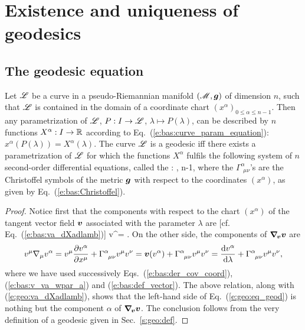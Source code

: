 
\section{Existence and uniqueness of geodesics}

\subsection{The geodesic equation}

\begin{greybox}
Let $\mathscr{L}$ be a curve in a pseudo-Riemannian
manifold $(\mathscr{M},\bm{g})$ of dimension $n$, such that
$\mathscr{L}$ is contained in the domain of a coordinate chart $(x^\alpha)_{0\leq\alpha\leq n-1}$.
Then any parametrization of $\mathscr{L}$, $P: I \to  \mathscr{L}$, $\lambda\mapsto P(\lambda)$,
can be described by $n$ functions $X^\alpha: I\to \mathbb{R}$
according to Eq.~(\ref{e:bas:curve_param_equation}): $x^\alpha(P(\lambda)) = X^\alpha(\lambda)$.
The curve $\mathscr{L}$ is a geodesic iff there exists a parametrization of $\mathscr{L}$
for which the functions $X^\alpha$ fulfils the following
system of $n$ second-order differential equations, called the
:
\be \label{e:geo:eq_geod}
    ,   \leq \alpha \leq n-1,
\ee
where the $\Gamma^\alpha_{\ \, \mu \nu}$'s are the Christoffel symbols of the metric $\bm{g}$
with respect to the coordinates $(x^\alpha)$, as given by Eq.~(\ref{e:bas:Christoffel}).
\end{greybox}
\begin{proof}
Notice first that the components with respect
to the chart $(x^\alpha)$ of the tangent
vector field $\bm{v}$ associated with the parameter $\lambda$ are [cf. Eq.~(\ref{e:bas:va_dXadlamb})]
\be \label{e:geo:va_dXadlamb}
    v^\alpha =  .
\ee
On the other side, the components of $\bm{\nabla}_{\!\bm{v}}\bm{v}$ are
\[
    v^\mu \nabla_\mu v^\alpha = v^\mu \frac{\partial v^\alpha}{\partial x^\mu} + \Gamma^\alpha_{\ \, \mu \nu} v^\mu v^\nu
    = \bm{v}(v^\alpha) + \Gamma^\alpha_{\ \, \mu \nu} v^\mu v^\nu
    = \frac{\mathrm{d} v^\alpha}{\mathrm{d} \lambda} + \Gamma^\alpha_{\ \, \mu \nu} v^\mu v^\nu ,
\]
where we have used
successively Eqs.~(\ref{e:bas:der_cov_coord}), (\ref{e:bas:v_va_wpar_a}) and
(\ref{e:bas:def_vector}). The above relation, along with (\ref{e:geo:va_dXadlamb}),
shows that the left-hand side of
Eq.~(\ref{e:geo:eq_geod}) is nothing but the component $\alpha$ of
$\bm{\nabla}_{\!\bm{v}}\bm{v}$. The conclusion follows from the very definition
of a geodesic given in Sec.~\ref{s:geo:def}.
\end{proof}

